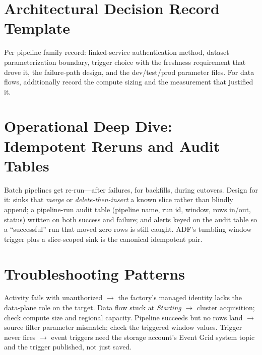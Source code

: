 \section{Architectural Decision Record Template}
Per pipeline family record: linked-service authentication method, dataset parameterization boundary, trigger choice with the freshness requirement that drove it, the failure-path design, and the dev/test/prod parameter files. For data flows, additionally record the compute sizing and the measurement that justified it.

\section{Operational Deep Dive: Idempotent Reruns and Audit Tables}
Batch pipelines get re-run---after failures, for backfills, during cutovers. Design for it: sinks that \emph{merge} or \emph{delete-then-insert} a known slice rather than blindly append; a pipeline-run audit table (pipeline name, run id, window, rows in/out, status) written on both success and failure; and alerts keyed on the audit table so a ``successful'' run that moved zero rows is still caught. ADF's tumbling window trigger plus a slice-scoped sink is the canonical idempotent pair.

\section{Troubleshooting Patterns}
Activity fails with unauthorized $\rightarrow$ the factory's managed identity lacks the data-plane role on the target. Data flow stuck at \emph{Starting} $\rightarrow$ cluster acquisition; check compute size and regional capacity. Pipeline succeeds but no rows land $\rightarrow$ source filter parameter mismatch; check the triggered window values. Trigger never fires $\rightarrow$ event triggers need the storage account's Event Grid system topic and the trigger published, not just saved.

